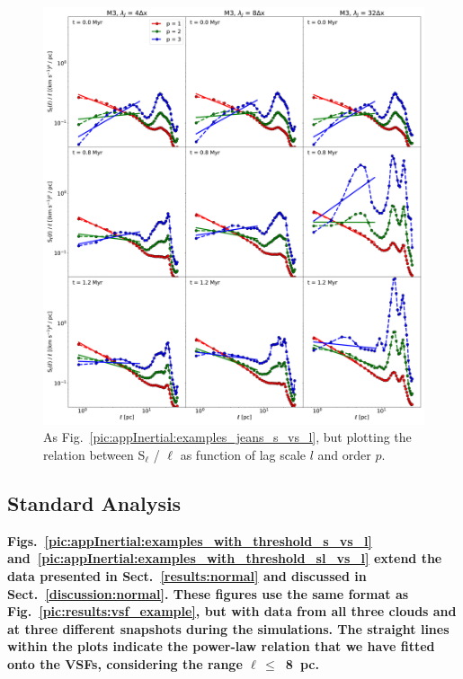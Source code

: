  	
\begin{figure}
    \centering
    \includegraphics[width=\textwidth]{app_examples_jeans_sl_l.pdf}
    \caption{
        As Fig.~\ref{pic:appInertial:examples_jeans_s_vs_l}, but plotting the relation between S$_{\ell}$ / $\ell$ as function of lag scale $l$ and order $p$.
    }
    \label{pic:appInertial:examples_jeans_sl_vs_l}
\end{figure}

\subsection{Standard Analysis}
\label{Bsub:standard}
\textbf{Figs.~\ref{pic:appInertial:examples_with_threshold_s_vs_l}
and~\ref{pic:appInertial:examples_with_threshold_sl_vs_l} extend the
data presented in
Sect.~\ref{results:normal} and discussed in Sect.~\ref{discussion:normal}.
These figures use the same format as Fig.~\ref{pic:results:vsf_example}, but with data from all three clouds and at three different snapshots during the simulations.
    The straight lines within the plots indicate the power-law
    relation that we have fitted onto the VSFs, considering the range 
$\ell\,\leq$~8~pc.
}

